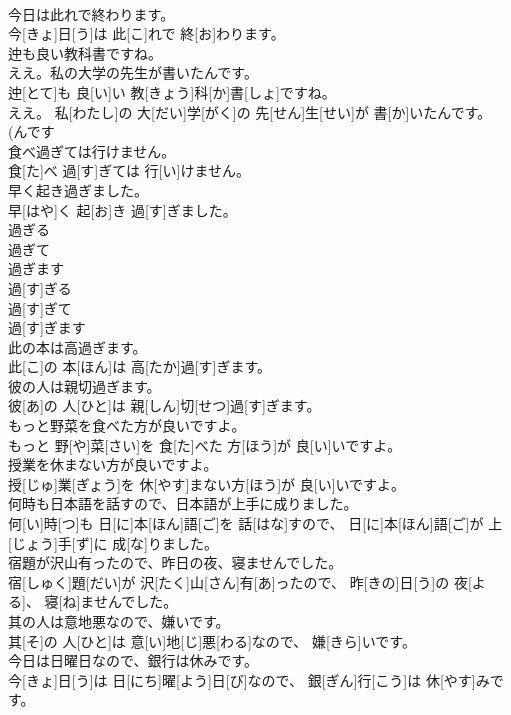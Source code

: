 \documentclass[8pt]{extreport}
\begin{document}
\begin{CJK}{UTF8}{min}
\\	今日は此れで終わります。	
\\	今[きょ]日[う]は 此[こ]れで 終[お]わります。
\\	迚も良い教科書ですね。 
\\	ええ。私の大学の先生が書いたんです。	
\\	迚[とて]も 良[い]い 教[きょう]科[か]書[しょ]ですね。 
\\	ええ。 私[わたし]の 大[だい]学[がく]の 先[せん]生[せい]が 書[か]いたんです。 (んです 
\\	食べ過ぎては行けません。	
\\	食[た]べ 過[す]ぎては 行[い]けません。
\\	早く起き過ぎました。	
\\	早[はや]く 起[お]き 過[す]ぎました。
\\	過ぎる 
\\	過ぎて 
\\	過ぎます	
\\	過[す]ぎる 
\\	過[す]ぎて 
\\	過[す]ぎます
\\	此の本は高過ぎます。	
\\	此[こ]の 本[ほん]は 高[たか]過[す]ぎます。
\\	彼の人は親切過ぎます。	
\\	彼[あ]の 人[ひと]は 親[しん]切[せつ]過[す]ぎます。
\\	もっと野菜を食べた方が良いですよ。	
\\	もっと 野[や]菜[さい]を 食[た]べた 方[ほう]が 良[い]いですよ。
\\	授業を休まない方が良いですよ。	
\\	授[じゅ]業[ぎょう]を 休[やす]まない方[ほう]が 良[い]いですよ。
\\	何時も日本語を話すので、日本語が上手に成りました。	
\\	何[い]時[つ]も 日[に]本[ほん]語[ご]を 話[はな]すので、 日[に]本[ほん]語[ご]が 上[じょう]手[ず]に 成[な]りました。
\\	宿題が沢山有ったので、昨日の夜、寝ませんでした。	
\\	宿[しゅく]題[だい]が 沢[たく]山[さん]有[あ]ったので、 昨[きの]日[う]の 夜[よる]、 寝[ね]ませんでした。
\\	其の人は意地悪なので、嫌いです。	
\\	其[そ]の 人[ひと]は 意[い]地[じ]悪[わる]なので、 嫌[きら]いです。
\\	今日は日曜日なので、銀行は休みです。	
\\	今[きょ]日[う]は 日[にち]曜[よう]日[び]なので、 銀[ぎん]行[こう]は 休[やす]みです。

\end{CJK}
\end{document}
